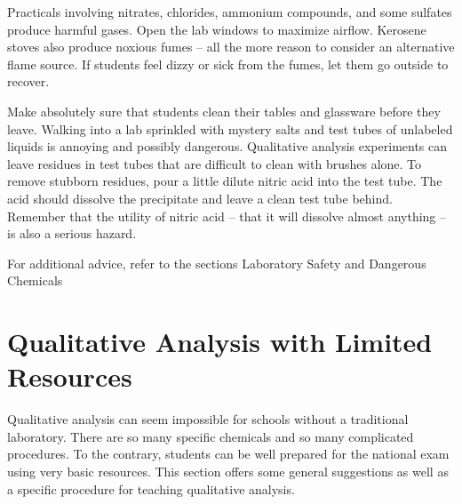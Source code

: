 Practicals involving nitrates, 
chlorides, 
ammonium compounds, 
and some sulfates produce harmful gases. 
Open the lab windows to maximize airflow. 
Kerosene stoves also produce noxious fumes – 
all the more reason to consider an alternative flame source. 
If students feel dizzy or sick from the fumes, 
let them go outside to recover.

Make absolutely sure that students clean their tables 
and glassware before they leave. 
Walking into a lab sprinkled with mystery salts 
and test tubes of unlabeled liquids is annoying and possibly dangerous. 
Qualitative analysis experiments can leave residues in test tubes 
that are difficult to clean with brushes alone. 
To remove stubborn residues, 
pour a little dilute nitric acid into the test tube. 
The acid should dissolve the precipitate 
and leave a clean test tube behind. 
Remember that the utility of nitric acid – 
that it will dissolve almost anything – is also a serious hazard.

For additional advice, 
refer to the sections Laboratory Safety and Dangerous Chemicals

\section{Qualitative Analysis with Limited Resources}

Qualitative analysis can seem impossible for schools 
without a traditional laboratory. 
There are so many specific chemicals 
and so many complicated procedures. 
To the contrary, 
students can be well prepared for the national exam 
using very basic resources. 
This section offers some general suggestions as well as 
a specific procedure for teaching qualitative analysis.

